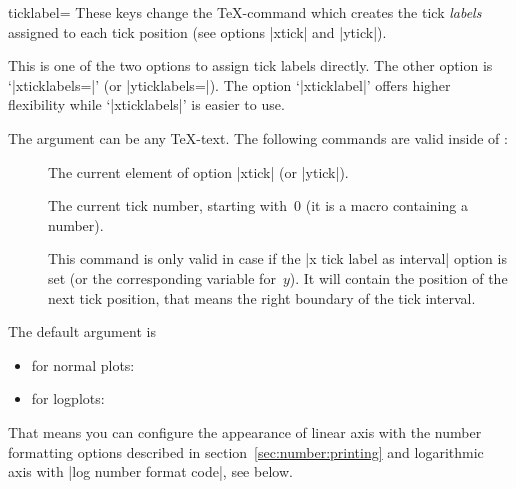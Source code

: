 \begin{pgfplotsxykey}{\x ticklabel=}
These keys change the \TeX-command which creates the tick \emph{labels} assigned to each tick position (see options |xtick| and |ytick|). 

This is one of the two options to assign tick labels directly. The other option is `|xticklabels=|' (or |yticklabels=|). The option `|xticklabel|' offers higher flexibility while `|xticklabels|' is easier to use.

The argument  can be any \TeX-text. The following commands are valid inside of :
\begin{description}
	\item[] \declareandlabel{\tick} The current element of option |xtick| (or |ytick|).
	\item[] \declareandlabel{\ticknum} The current tick number, starting with~0 (it is a macro containing a number).
	\item[] \declareandlabel{\nexttick} This command is only valid in case if the |x tick label as interval| option is set (or the corresponding variable for~$y$). It will contain the position of the next tick position, that means the right boundary of the tick interval.
\end{description}
The default argument is 
\begin{itemize}
	\item \declareandlabel{\axisdefaultticklabel} for normal plots:
\begin{codeexample}
\def\axisdefaultticklabel{$\pgfmathprintnumber{\tick}$}
\end{codeexample}

	\item \declareandlabel{\axisdefaultticklabellog} for logplots:
\begin{codeexample}
\def\axisdefaultticklabellog{%
	\pgfkeysgetvalue{/pgfplots/log number format code/.@cmd}\pgfplots@log@label@style
	\expandafter\pgfplots@log@label@style\tick\pgfeov
}
\end{codeexample}
\end{itemize}
That means you can configure the appearance of linear axis with the number formatting options described in section~\ref{sec:number:printing} and logarithmic axis with |log number format code|, see below.

\begin{codeexample}[]
\end{codeexample}


\end{pgfplotsxykey}
